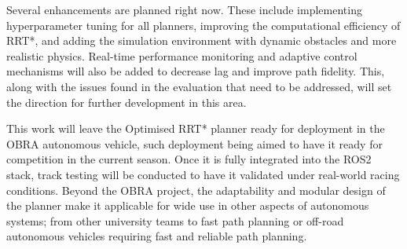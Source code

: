\documentclass[a4paper,11pt]{report}
\begin{document}
Several enhancements are planned right now. These include implementing hyperparameter tuning for all planners, 
improving the computational efficiency of RRT*, and adding the simulation environment with dynamic obstacles and 
more realistic physics. Real-time performance monitoring and adaptive control mechanisms will also be added to decrease 
lag and improve path fidelity. This, along with the issues found in the evaluation that need to be addressed, will set the direction for further development in this area.

This work will leave the Optimised RRT* planner ready for deployment in the OBRA autonomous vehicle, 
such deployment being aimed to have it ready for competition in the current season. Once it is fully 
integrated into the ROS2 stack, track testing will be conducted to have it validated under real-world racing conditions. 
Beyond the OBRA project, the adaptability and modular design of the planner make it applicable for wide use in other aspects of 
autonomous systems; from other university teams to fast path planning or off-road autonomous vehicles  requiring fast and reliable path planning.


\cleardoublepage
{}
{}
\end{document}
